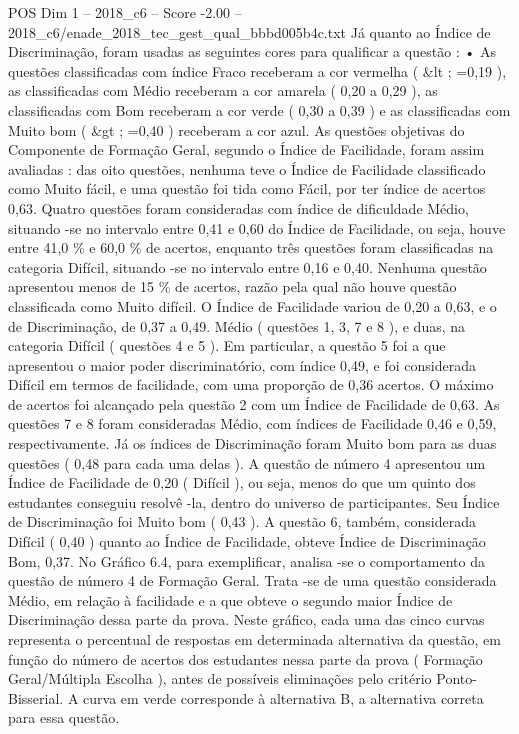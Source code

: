 \begin{textsample}{POS Dim 1 – 2018\_c6 – Score -2.00 – 2018\_c6/enade\_2018\_tec\_gest\_qual\_bbbd005b4c.txt}
Já quanto ao Índice de Discriminação, foram usadas as seguintes cores para qualificar a questão : • As questões classificadas com índice Fraco receberam a cor vermelha ( \&lt ; =0,19 ), as classificadas com Médio receberam a cor amarela ( 0,20 a 0,29 ), as classificadas com Bom receberam a cor verde ( 0,30 a 0,39 ) e as classificadas com Muito bom ( \&gt ; =0,40 ) receberam a cor azul.
As questões objetivas do Componente de Formação Geral, segundo o Índice de Facilidade, foram assim avaliadas : das oito questões, nenhuma teve o Índice de Facilidade classificado como Muito fácil, e uma questão foi tida como Fácil, por ter índice de acertos 0,63.
Quatro questões foram consideradas com índice de dificuldade Médio, situando -se no intervalo entre 0,41 e 0,60 do Índice de Facilidade, ou seja, houve entre 41,0 \% e 60,0 \% de acertos, enquanto três questões foram classificadas na categoria Difícil, situando -se no intervalo entre 0,16 e 0,40.
Nenhuma questão apresentou menos de 15 \% de acertos, razão pela qual não houve questão classificada como Muito difícil.
O Índice de Facilidade variou de 0,20 a 0,63, e o de Discriminação, de 0,37 a 0,49.
Médio ( questões 1, 3, 7 e 8 ), e duas, na categoria Difícil ( questões 4 e 5 ).
Em particular, a questão 5 foi a que apresentou o maior poder discriminatório, com índice 0,49, e foi considerada Difícil em termos de facilidade, com uma proporção de 0,36 acertos.
O máximo de acertos foi alcançado pela questão 2 com um Índice de Facilidade de 0,63.
As questões 7 e 8 foram consideradas Médio, com índices de Facilidade 0,46 e 0,59, respectivamente.
Já os índices de Discriminação foram Muito bom para as duas questões ( 0,48 para cada uma delas ).
A questão de número 4 apresentou um Índice de Facilidade de 0,20 ( Difícil ), ou seja, menos do que um quinto dos estudantes conseguiu resolvê -la, dentro do universo de participantes.
Seu Índice de Discriminação foi Muito bom ( 0,43 ).
A questão 6, também, considerada Difícil ( 0,40 ) quanto ao Índice de Facilidade, obteve Índice de Discriminação Bom, 0,37.
No Gráfico 6.4, para exemplificar, analisa -se o comportamento da questão de número 4 de Formação Geral.
Trata -se de uma questão considerada Médio, em relação à facilidade e a que obteve o segundo maior Índice de Discriminação dessa parte da prova.
Neste gráfico, cada uma das cinco curvas representa o percentual de respostas em determinada alternativa da questão, em função do número de acertos dos estudantes nessa parte da prova ( Formação Geral/Múltipla Escolha ), antes de possíveis eliminações pelo critério Ponto-Bisserial.
A curva em verde corresponde à alternativa B, a alternativa correta para essa questão.

\end{textsample}
